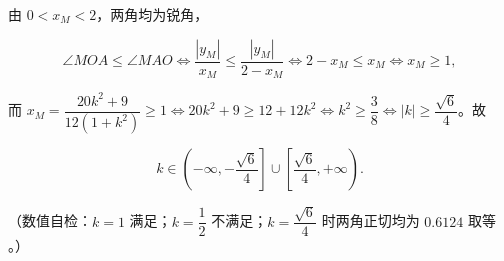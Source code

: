 \begin{answer}
由 \(0<x_{M}<2\)，两角均为锐角，

\nopagebreak[4]
\[
\angle MOA\leqslant\angle MAO\iff\frac{|y_{M}|}{x_{M}}\leqslant\frac{|y_{M}|}{2-x_{M}}\iff 2-x_{M}\leqslant x_{M}\iff x_{M}\geqslant1,
\]

而 \(x_{M}=\dfrac{20k^{2}+9}{12(1+k^{2})}\geqslant1\iff 20k^{2}+9\geqslant12+12k^{2}\iff k^{2}\geqslant\dfrac{3}{8}\iff|k|\geqslant\dfrac{\sqrt{6}}{4}\)。故

\nopagebreak[4]
\[
k\in\left(-\infty,-\frac{\sqrt{6}}{4}\right]\cup\left[\frac{\sqrt{6}}{4},+\infty\right).
\]

（数值自检：\(k=1\) 满足；\(k=\dfrac{1}{2}\) 不满足；\(k=\dfrac{\sqrt{6}}{4}\) 时两角正切均为 \(0.6124\) 取等 。）


\gkanswer{答案（2）：\(k\in\left(-\infty,-\dfrac{\sqrt{6}}{4}\right]\cup\left[\dfrac{\sqrt{6}}{4},+\infty\right)\)。}

\end{answer}
